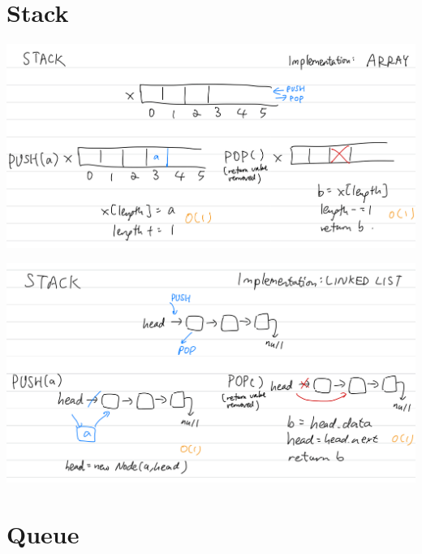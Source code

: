 \section{Stack}

\includegraphics[width=16cm]{images/ch6-stackarray.png}

\includegraphics[width=16cm]{images/ch6-stacklinkedlist.png}
\section{Queue}
